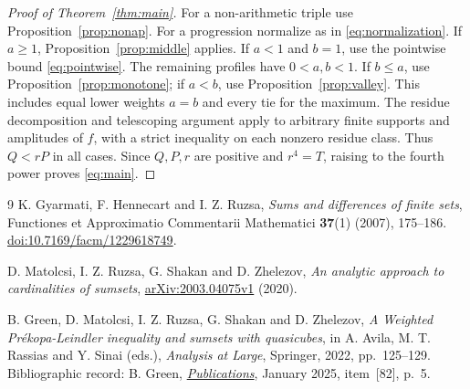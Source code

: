 \documentclass[11pt,a4paper]{article}
\theoremstyle{remark}
\begin{document}
\begin{proof}[Proof of Theorem~\ref{thm:main}]
For a non-arithmetic triple use Proposition~\ref{prop:nonap}.
For a progression normalize as in \eqref{eq:normalization}.
If $a\ge1$, Proposition~\ref{prop:middle} applies.
If $a<1$ and $b=1$, use the pointwise bound \eqref{eq:pointwise}.
The remaining profiles have $0<a,b<1$.
If $b\le a$, use Proposition~\ref{prop:monotone};
if $a<b$, use Proposition~\ref{prop:valley}.
This includes equal lower weights $a=b$ and every tie for the maximum.
The residue decomposition and telescoping argument apply to arbitrary
finite supports and amplitudes of $f$, with a strict inequality on each
nonzero residue class. Thus $Q<rP$ in all cases.
Since $Q,P,r$ are positive and $r^4=T$, raising to the fourth power
proves \eqref{eq:main}.
\end{proof}

\begingroup
\small
\begin{thebibliography}{9}
K. Gyarmati, F. Hennecart and I. Z. Ruzsa,
\emph{Sums and differences of finite sets},
Functiones et Approximatio Commentarii Mathematici
\textbf{37}(1) (2007), 175--186.
\href{https://doi.org/10.7169/facm/1229618749}{doi:10.7169/facm/1229618749}.

D. Matolcsi, I. Z. Ruzsa, G. Shakan and D. Zhelezov,
\emph{An analytic approach to cardinalities of sumsets},
\href{https://arxiv.org/abs/2003.04075v1}{arXiv:2003.04075v1} (2020).

B. Green, D. Matolcsi, I. Z. Ruzsa, G. Shakan and D. Zhelezov,
\emph{A Weighted Pr\'ekopa-Leindler inequality and sumsets with quasicubes},
in A. Avila, M. T. Rassias and Y. Sinai (eds.),
\emph{Analysis at Large}, Springer, 2022, pp.~125--129.
Bibliographic record: B. Green,
\href{https://people.maths.ox.ac.uk/greenbj/papers/publist.pdf}{\emph{Publications}}, January 2025,
item~[82], p.~5.
\end{thebibliography}
\endgroup
\end{document}
